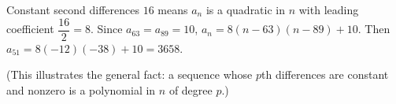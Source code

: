 Constant second differences $16$ means $a_n$ is a quadratic in $n$ with leading coefficient $\dfrac{16}2=8$. Since $a_{63}=a_{89}=10$, $a_n=8(n-63)(n-89)+10$. Then $a_{51}=8(-12)(-38)+10=\boxed{3658}$.

(This illustrates the general fact: a sequence whose $p$th differences are constant and nonzero is a polynomial in $n$ of degree $p$.)
